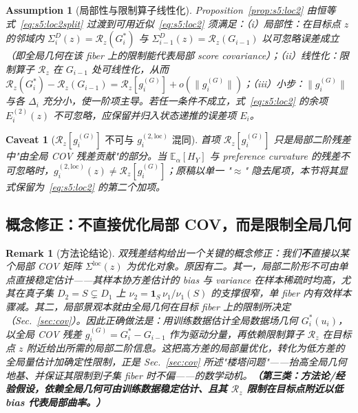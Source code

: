 \documentclass[11pt,a4paper]{article}
\newtheorem{remark}[theorem]{Remark}
\newtheorem{caveat}[theorem]{Caveat}
\newtheorem{assumption}[theorem]{Assumption}
\newcommand{\E}{\mathbb{E}}
\newcommand{\Rstr}{\mathcal{R}}     %
\begin{document}
\begin{assumption}[局部性与限制算子线性化]\label{ass:s5:loc}
Proposition~\ref{prop:s5:loc2} 由恒等式~\eqref{eq:s5:loc2split} 过渡到可用近似~\eqref{eq:s5:loc2} 须满足：（i）\emph{局部性}：在目标点 $z$ 的邻域内 $\Sigma_i^D(z)=\Rstr_z(G_i^*)$ 与 $\Sigma_{i-1}^D(z)=\Rstr_z(G_{i-1})$ 以可忽略误差成立（即全局几何在该 fiber 上的限制能代表局部 score covariance）；（ii）\emph{线性化}：限制算子 $\Rstr_z$ 在 $G_{i-1}$ 处可线性化，从而 $\Rstr_z(G_i^*)-\Rstr_z(G_{i-1})=\Rstr_z[g_i^{(G)}]+o(\|g_i^{(G)}\|)$；（iii）\emph{小步}：$\|g_i^{(G)}\|$ 与各 $\Delta_i$ 充分小，使一阶项主导。若任一条件不成立，式~\eqref{eq:s5:loc2} 的余项 $E_i^{(2)}(z)$ 不可忽略，应保留并归入状态递推的误差项 $E_i$。
\end{assumption}

\begin{caveat}[{$\Rstr_z[g_i^{(G)}]$ 不可与 $g_i^{(2,\mathrm{loc})}$ 混同}]\label{cav:s5:notequal}
首项 $\Rstr_z[g_i^{(G)}]$ 只是局部二阶残差中"由全局 COV 残差贡献"的部分。当 $\E_\alpha[H_Y]$ 与 preference curvature 的残差不可忽略时，$g_i^{(2,\mathrm{loc})}(z)\neq\Rstr_z[g_i^{(G)}]$；原稿以单一 "$\approx$" 隐去尾项，本节将其显式保留为~\eqref{eq:s5:loc2} 的第二个加项。
\end{caveat}

\subsection{概念修正：不直接优化局部 COV，而是限制全局几何}

\begin{remark}[方法论结论]\label{rem:s5:method}
双残差结构给出一个关键的概念修正：我们\textbf{不}直接以某个局部 COV 矩阵 $\Sigma^{\mathrm{loc}}(z)$ 为优化对象。原因有二。其一，局部二阶形不可由单点直接稳定估计——其样本协方差估计的 bias 与 variance 在样本稀疏时均高，尤其在真子集 $D_2=S\subsetneq D_1$ 上 $\nu_2=\mathbf 1_S\,\nu_1/\nu_1(S)$ 的支撑很窄，单 fiber 内有效样本骤减。其二，局部景观本就由全局几何在目标 fiber 上的限制所决定（Sec.~\ref{sec:cov}）。因此正确做法是：用训练数据估计\emph{全局}数据场几何 $G_i^*(u_i)$，以全局 COV 残差 $g_i^{(G)}=G_i^*-G_{i-1}$ 作为驱动分量，再依赖限制算子 $\Rstr_z$ 在目标点 $z$ 附近给出所需的局部二阶信息。这把高方差的局部量优化，转化为低方差的全局量估计加确定性限制，正是 Sec.~\ref{sec:cov} 所述"楼塔问题"——抬高全局几何地基、并保证其限制到子集 fiber 时不偏——的数学动机。\textbf{（第三类：方法论/经验假设，依赖全局几何可由训练数据稳定估计、且其 $\Rstr_z$ 限制在目标点附近以低 bias 代表局部曲率。）}
\end{remark}
\end{document}
